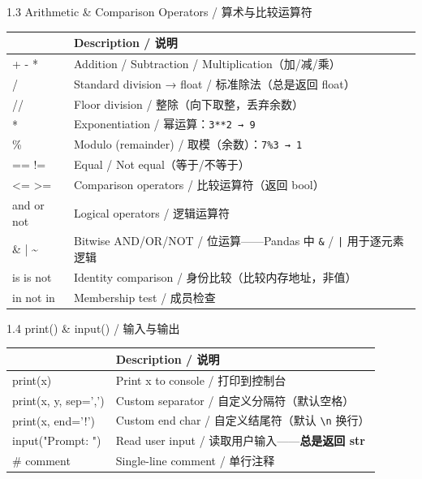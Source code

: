 \documentclass[11pt,a4paper]{report}
\let\oldtexttt\texttt
\renewcommand{\texttt}[1]{\textcolor{mainblue}{\oldtexttt{#1}}}
\begin{document}
\begin{cmdsection}{1.3  Arithmetic \& Comparison Operators / 算术与比较运算符}
\normalsize\renewcommand{\arraystretch}{1.4}
\centering
\begin{tabularx}{\textwidth}{@{}>{\ttfamily}l>{\raggedright\arraybackslash}X@{}}
\toprule
\multicolumn{1}{@{}l}{\textbf{Operator}} & \textbf{Description / 说明} \\ \midrule
+  -  *                 & Addition / Subtraction / Multiplication（加/减/乘） \\
/                       & Standard division → float / 标准除法（总是返回 float） \\
//                      & Floor division / 整除（向下取整，丢弃余数） \\
**                      & Exponentiation / 幂运算：\texttt{3**2 → 9} \\
\%                      & Modulo (remainder) / 取模（余数）：\texttt{7\%3 → 1} \\
==  !=                  & Equal / Not equal（等于/不等于） \\
<  >  <=  >=            & Comparison operators / 比较运算符（返回 bool） \\
and  or  not            & Logical operators / 逻辑运算符 \\
\&  |  \textasciitilde  & Bitwise AND/OR/NOT / 位运算——Pandas 中 \texttt{\&} / \texttt{|} 用于逐元素逻辑 \\
is  is not              & Identity comparison / 身份比较（比较内存地址，非值） \\
in  not in              & Membership test / 成员检查 \\
\bottomrule
\end{tabularx}
\end{cmdsection}

\begin{cmdsection}{1.4  print() \& input() / 输入与输出}
\normalsize\renewcommand{\arraystretch}{1.4}
\centering
\begin{tabularx}{\textwidth}{@{}>{\ttfamily}l>{\raggedright\arraybackslash}X@{}}
\toprule
\multicolumn{1}{@{}l}{\textbf{Syntax}} & \textbf{Description / 说明} \\ \midrule
print(x)                & Print x to console / 打印到控制台 \\
print(x, y, sep=',')    & Custom separator / 自定义分隔符（默认空格） \\
print(x, end='!')       & Custom end char / 自定义结尾符（默认 \texttt{\textbackslash n} 换行） \\
input("Prompt: ")       & Read user input / 读取用户输入——\textbf{总是返回 str} \\
\# comment              & Single-line comment / 单行注释 \\
\bottomrule
\end{tabularx}
\end{cmdsection}
\end{document}
